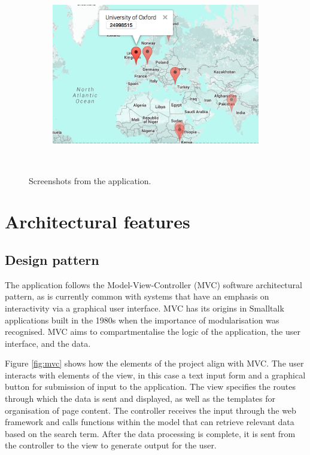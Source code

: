 \documentclass[Report.tex]{subfiles}
\begin{document}
\begin{figure}[!h]
\begin{subfigure}{0.45\textwidth}
	\end{subfigure}%
	\hfill
	\begin{subfigure}{0.45\textwidth}
		\includegraphics[width=\textwidth]{../lib/images/screen4}
	\end{subfigure}\\
\caption{Screenshots from the application.}
\label{fig:screen1}
\end{figure}\newpage

\section{Architectural features}
\subsection{Design pattern}
The application follows the Model-View-Controller (MVC) software architectural pattern, as is currently common with systems that have an emphasis on interactivity via a graphical user interface. MVC has its origins in Smalltalk applications built in the 1980s when the importance of modularisation was recognised. MVC aims to compartmentalise the logic of the application, the user interface, and the data.\newline 

\noindent Figure \ref{fig:mvc} shows how the elements of the project align with MVC. The user interacts with elements of the view, in this case a text input form and a graphical button for submission of input to the application. The view specifies the routes through which the data is sent and displayed, as well as the templates for organisation of page content\cite{mozilla_mvc}. The controller receives the input through the web framework and calls functions within the model that can retrieve relevant data based on the search term. After the data processing is complete, it is sent from the controller to the view to generate output for the user. \newline
\end{document}
